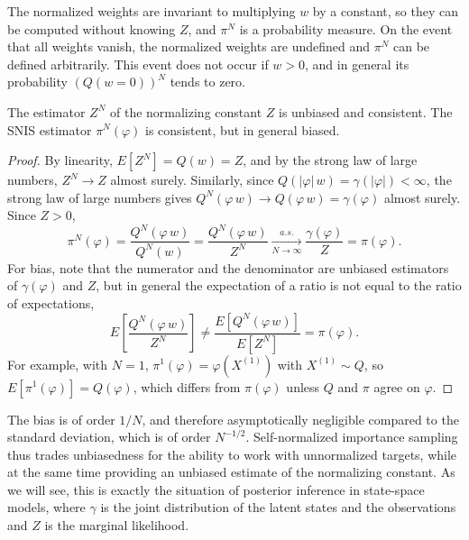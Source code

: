 The normalized weights are invariant to multiplying $w$ by a constant, so they can be computed without knowing $Z$, and $\pi^N$ is a probability measure. On the event that all weights vanish, the normalized weights are undefined and $\pi^N$ can be defined arbitrarily. This event does not occur if $w>0$, and in general its probability $\left(Q(w=0)\right)^N$ tends to zero.

\begin{proposition}
    \label{prop:snis}
    The estimator $Z^N$ of the normalizing constant $Z$ is unbiased and consistent. The SNIS estimator $\pi^N(\varphi)$ is consistent, but in general biased.
\end{proposition}
\begin{proof}
    By linearity, $E[Z^N] = Q(w) = Z$, and by the strong law of large numbers, $Z^N\to Z$ almost surely. Similarly, since $Q(|\varphi|\,w) = \gamma(|\varphi|)<\infty$, the strong law of large numbers gives $Q^N(\varphi\,w)\to Q(\varphi\,w) = \gamma(\varphi)$ almost surely. Since $Z>0$,
    \begin{equation}
        \pi^N(\varphi) = \frac{Q^N(\varphi\,w)}{Q^N(w)} = \frac{Q^N(\varphi\,w)}{Z^N}\xrightarrow[N\to\infty]{a.s.}\frac{\gamma(\varphi)}{Z} = \pi(\varphi).
    \end{equation}
    For bias, note that the numerator and the denominator are unbiased estimators of $\gamma(\varphi)$ and $Z$, but in general the expectation of a ratio is not equal to the ratio of expectations,
    \begin{equation}
        E\left[\frac{Q^N(\varphi\,w)}{Z^N}\right] \neq \frac{E[Q^N(\varphi\,w)]}{E[Z^N]} = \pi(\varphi).
    \end{equation}
    For example, with $N=1$, $\pi^1(\varphi) = \varphi(X^{(1)})$ with $X^{(1)}\sim Q$, so $E[\pi^1(\varphi)] = Q(\varphi)$, which differs from $\pi(\varphi)$ unless $Q$ and $\pi$ agree on $\varphi$.
\end{proof}

The bias is of order $1/N$, and therefore asymptotically negligible compared to the standard deviation, which is of order $N^{-1/2}$. Self-normalized importance sampling thus trades unbiasedness for the ability to work with unnormalized targets, while at the same time providing an unbiased estimate of the normalizing constant. As we will see, this is exactly the situation of posterior inference in state-space models, where $\gamma$ is the joint distribution of the latent states and the observations and $Z$ is the marginal likelihood.

